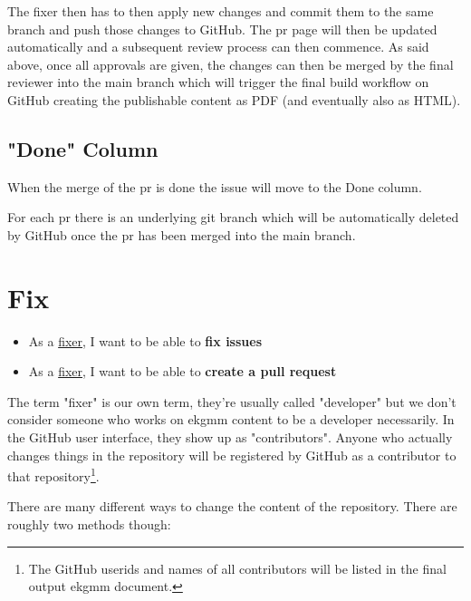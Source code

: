 The fixer then has to then apply new changes and commit 
them to the same branch and push those changes to GitHub. 
The \gls{pr} page will then be updated automatically and a subsequent 
review process can then commence.
As said above, once all approvals are given, 
the changes can then be merged by the final reviewer 
into the main branch which will trigger the final build 
workflow on GitHub creating the publishable content as 
PDF (and eventually also as HTML).

\subsection{"Done" Column}
\label{subsec:ekg-mm-process-done-column}

When the merge of the \gls{pr} is done the issue will move to 
the Done column. 

For each \gls{pr} there is an underlying git branch which 
will be automatically deleted by GitHub once the \gls{pr} 
has been merged into the main branch.

\pagebreak
\section{Fix}
\label{sec:ekg-mm-process-fix}

\begin{tcolorbox}[colback=secondary!5,colframe=secondary!80,title=\textbf{User Stories}]
    \begin{itemize}[leftmargin=1em]
        \item As a \underline{fixer}, I want to be able to \textbf{fix issues}
        \item As a \underline{fixer}, I want to be able to \textbf{create a pull request}
    \end{itemize}
\end{tcolorbox}

The term "fixer" is our own term, they’re usually called "developer" but 
we don’t consider someone who works on \gls{ekgmm} content to be a developer necessarily.
In the GitHub user interface, they show up as "contributors".
Anyone who actually changes things in the repository will be registered by GitHub as 
a contributor to that repository\footnote{The GitHub userids and names of all 
contributors will be listed in the final output \gls{ekgmm} document.}.

There are many different ways to change the content of the repository. 
There are roughly two methods though:

